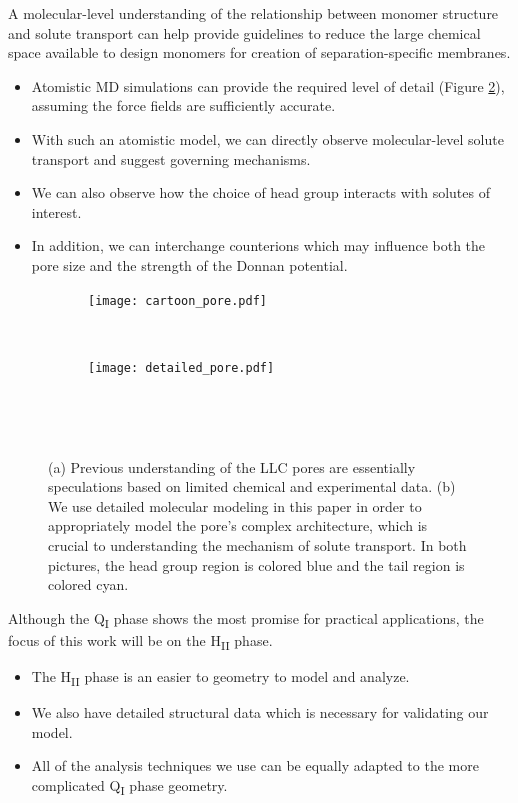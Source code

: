   A molecular-level understanding of the relationship between monomer structure
  and solute transport can help provide guidelines to reduce the
  large chemical space available to design monomers for creation of
  separation-specific membranes.
  \begin{itemize}
    \item Atomistic MD simulations can provide the required level of detail 
    (Figure \ref{fig:detailed_pore}), assuming the force fields are sufficiently accurate. 
    \item With such an atomistic model, we can directly observe
  molecular-level solute transport and suggest governing mechanisms. 
    \item We can also observe how the choice of head group interacts with solutes
    of interest. 
    \item In addition, we can interchange counterions which may influence both the pore size
    and the strength of the Donnan potential.
  \end{itemize}

  \begin{figure}[!htb]
  \centering
	\begin{subfigure}{0.45\linewidth}
		\centering
		\texttt{[image: cartoon\_pore.pdf]}
		\caption{}~\label{fig:undetailed_pore}
	\end{subfigure}
	\begin{subfigure}{0.45\linewidth}
		\centering
		\texttt{[image: detailed\_pore.pdf]}
		\caption{}~\label{fig:detailed_pore}
	\end{subfigure} 
    \caption{(a) Previous understanding of the LLC pores are essentially speculations 
    based on limited chemical and experimental data. (b) We use detailed molecular 
    modeling in this paper in order to appropriately model the pore's complex architecture,
    which is crucial to understanding the mechanism of solute transport. In both 
    pictures, the head group region is colored blue and the tail region is colored cyan.}~\label{fig:detail}
  \end{figure}

  Although the Q\textsubscript{I} phase shows the most promise for
  practical applications, the focus of this work will be on the H\textsubscript{II}
  phase.
  \begin{itemize}
    \item The H\textsubscript{II} phase is an easier to geometry to model
    and analyze.
    \item We also have detailed structural data which is necessary for validating
    our model.
    \item All of the analysis techniques we use can be equally adapted to
    the more complicated Q\textsubscript{I} phase geometry.
  \end{itemize}
  

